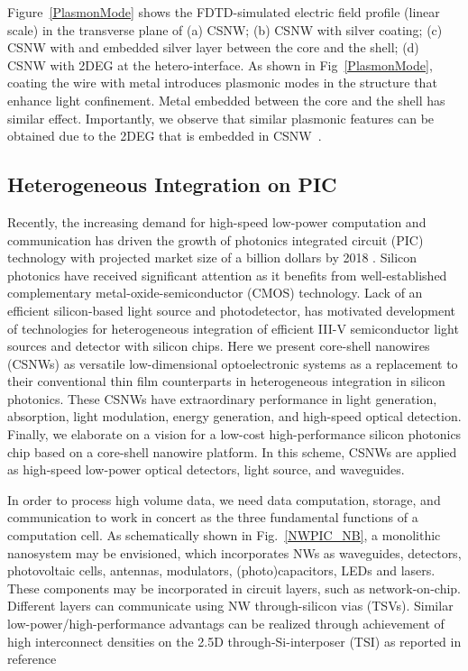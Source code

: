 Figure~\ref{PlasmonMode} shows the FDTD-simulated electric field profile
(linear scale) in the transverse plane of (a) CSNW; (b) CSNW with silver
coating; (c) CSNW with and embedded silver layer between the core and the
shell; (d) CSNW with 2DEG at the hetero-interface. As shown in
Fig~\ref{PlasmonMode}, coating the wire with metal introduces plasmonic modes
in the structure that enhance light confinement. Metal embedded between the
core and the shell has similar effect. Importantly, we observe that similar
plasmonic features can be obtained due to the 2DEG that is embedded in
CSNW~\cite{montazeri2016plasmonic}.

\subsection{Heterogeneous Integration on PIC}

Recently, the increasing demand for high-speed low-power computation and
communication has driven the growth of photonics integrated circuit
(PIC) technology with projected market size of a billion dollars by 2018
. Silicon photonics have received significant attention as it
benefits from well-established complementary metal-oxide-semiconductor
(CMOS) technology. Lack of an efficient silicon-based light source and
photodetector, has motivated development of technologies for
heterogeneous integration of efficient III-V semiconductor light sources
and detector with silicon chips. Here we present core-shell
nanowires (CSNWs) as versatile low-dimensional optoelectronic systems as
a replacement to their conventional thin film counterparts in
heterogeneous integration in silicon photonics. These CSNWs have
extraordinary performance in light generation, absorption, light
modulation, energy generation, and high-speed optical detection.
Finally, we elaborate on a vision for a low-cost high-performance
silicon photonics chip based on a core-shell nanowire platform. In this
scheme, CSNWs are applied as high-speed low-power optical detectors,
light source, and waveguides.

In order to process high volume data,
we need data computation, storage, and communication to work in concert as the
three fundamental functions of a computation cell. As schematically shown in
Fig.~\ref{NWPIC_NB}, a monolithic nanosystem may be envisioned, which
incorporates NWs as waveguides, detectors, photovoltaic cells, antennas,
modulators, (photo)capacitors, LEDs and lasers. These components may be
incorporated in circuit layers, such as network-on-chip. Different layers can
communicate using NW through-silicon vias (TSVs). Similar
low-power/high-performance advantags can be realized through achievement of
high interconnect densities on the 2.5D through-Si-interposer (TSI) as reported
in reference~\cite{Zhang:2015ec} 

